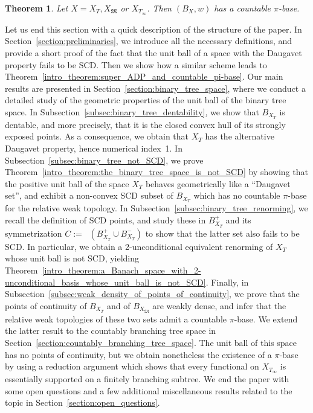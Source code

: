 \documentclass[11pt,a4paper,reqno]{amsart}
\numberwithin{equation}{section}
\DeclareMathOperator{\cconv}{\overline{conv}}
\newcommand{\1}{\mathbbm{1}}
\theoremstyle{plain}
\newtheorem{theorem}{Theorem}[section]
\theoremstyle{definition}
\begin{document}
\begin{theorem}\label{intro_theorem:tree_spaces_unit_balls_have_countable_pi-bases}
    Let $X=X_T,X_\mathfrak{M}$ or $X_{T_\infty}$. Then $(B_X,w)$ has a countable $\pi$-base. 
\end{theorem}

Let us end this section with a quick description of the structure of the paper. In Section~\ref{section:preliminaries}, we introduce all the necessary definitions, and provide a short proof of the fact that the unit ball of a space with the Daugavet property fails to be SCD. Then we show how a similar scheme leads to Theorem~\ref{intro_theorem:super_ADP_and_countable_pi-base}. Our main results are presented in Section~\ref{section:binary_tree_space}, where we conduct a detailed study of the geometric properties of the unit ball of the binary tree space. In Subsection~\ref{subsec:binary_tree_dentability}, we show that $B_{X_T}$ is dentable, and more precisely, that it is the closed convex hull of its strongly exposed points. As a consequence, we obtain that $X_T$ has the alternative Daugavet property, hence numerical index~1. In Subsection~\ref{subsec:binary_tree_not_SCD}, we prove Theorem~\ref{intro_theorem:the_binary_tree_space_is_not_SCD} by showing that the positive unit ball of the space $X_T$ behaves geometrically like a ``Daugavet set'', and exhibit a non-convex SCD subset of $B_{X_T}$ which has no countable $\pi$-base for the relative weak topology. In Subsection~\ref{subsec:binary_tree_renorming}, we recall the definition of SCD points, and study these in $B_{X_T}^+$ and its symmetrization $C:=\cconv(B_{X_T}^+\cup B_{X_T}^-)$ to show that the latter set also fails to be SCD. In particular, we obtain a 2-unconditional equivalent renorming of $X_T$ whose unit ball is not SCD, yielding Theorem~\ref{intro_theorem:a_Banach_space_with_2-unconditional_basis_whose_unit_ball_is_not_SCD}. Finally, in Subsection~\ref{subsec:weak_density_of_points_of_continuity}, we prove that the points of continuity of $B_{X_T}$ and of $B_{X_\mathfrak{M}}$ are weakly dense, and infer that the relative weak topologies of these two sets admit a countable $\pi$-base. We extend the latter result to the countably branching tree space in Section~\ref{section:countably_branching_tree_space}. The unit ball of this space has no points of continuity, but we obtain nonetheless the existence of a $\pi$-base by using a reduction argument which shows that every functional on $X_{T_\infty}$ is essentially supported on a finitely branching subtree. We end the paper with some open questions and a few additional miscellaneous results related to the topic in Section~\ref{section:open_questions}. 
\end{document}
